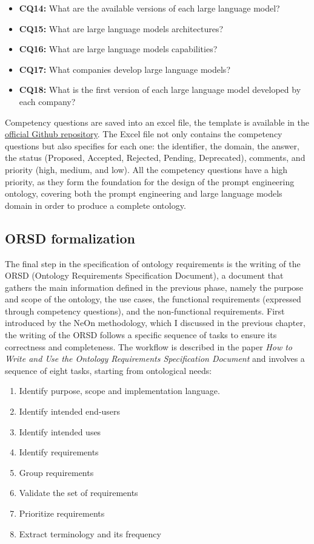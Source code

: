 \begin{itemize}
    \item \textbf{CQ14:} What are the available versions of each large language model?

    \item \textbf{CQ15:} What are large language models architectures?

    \item \textbf{CQ16:} What are large language models capabilities?

    \item \textbf{CQ17:} What companies develop large language models?

    \item \textbf{CQ18:} What is the first version of each large language model developed by each company?
\end{itemize}
Competency questions are saved into an excel file, the template is available in the \href{https://github.com/oeg-upm/LOT-resources}{official Github repository}. The Excel file not only contains the competency questions but also specifies for each one: the identifier, the domain, the answer, the status (Proposed, Accepted, Rejected, Pending, Deprecated), comments, and priority (high, medium, and low). All the competency questions have a high priority, as they form the foundation for the design of the prompt engineering ontology, covering both the prompt engineering and large language models domain in order to produce a complete ontology.

\subsection{ORSD formalization}
The final step in the specification of ontology requirements is the writing of the ORSD (Ontology Requirements Specification Document), a document that gathers the main information defined in the previous phase, namely the purpose and scope of the ontology, the use cases, the functional requirements (expressed through competency questions), and the non-functional requirements. First introduced by the NeOn methodology, which I discussed in the previous chapter, the writing of the ORSD follows a specific sequence of tasks to ensure its correctness and completeness. The workflow is described in the paper \textit{How to Write and Use the Ontology Requirements Specification Document}\cite{suarez2009write} and involves a sequence of eight tasks, starting from ontological needs: 
\begin{enumerate}
    \item Identify purpose, scope and implementation language.
    \item Identify intended end-users
    \item Identify intended uses
    \item Identify requirements
    \item Group requirements
    \item Validate the set of requirements
    \item Prioritize requirements
    \item Extract terminology and its frequency
\end{enumerate}

